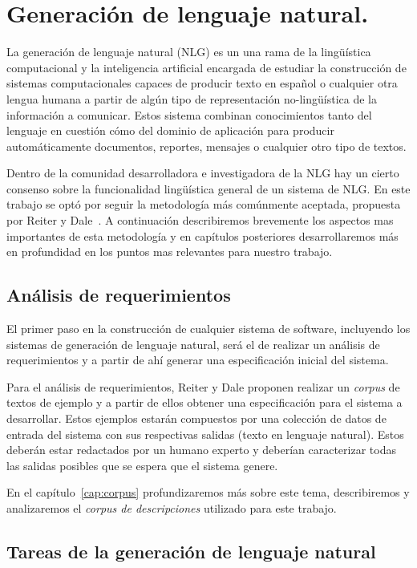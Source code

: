 \chapter{Generación de lenguaje natural.}
\label{cap:nlg_intro}
La generación de lenguaje natural (NLG) es un una rama de la lingüística computacional y la inteligencia artificial encargada de estudiar la construcción de sistemas computacionales capaces de producir texto en español o cualquier otra lengua humana a partir de algún tipo de representación no-lingüística de la información a comunicar. Estos sistema combinan conocimientos tanto del lenguaje en cuestión cómo del dominio de aplicación para producir automáticamente documentos, reportes, mensajes o cualquier otro tipo de textos.

Dentro de la comunidad desarrolladora e investigadora de la NLG hay un cierto consenso sobre la funcionalidad lingüística general de un sistema de NLG.
En este trabajo se optó por seguir la metodología más comúnmente aceptada, propuesta por Reiter y Dale~\cite{reiter_dale}.
A continuación describiremos brevemente los aspectos mas importantes de esta metodología y en capítulos posteriores desarrollaremos más en profundidad en los puntos mas relevantes para nuestro trabajo.

\section{Análisis de requerimientos}
El primer paso en la construcción de cualquier sistema de software, incluyendo los sistemas de generación de lenguaje natural, será el de realizar un análisis de requerimientos y a partir de ahí generar una especificación inicial del sistema. 

Para el análisis de requerimientos, Reiter y Dale proponen realizar un \emph{corpus} de textos de ejemplo y a partir de ellos obtener una especificación para el sistema a desarrollar. Estos ejemplos estarán compuestos por una colección de datos de entrada del sistema con sus respectivas salidas (texto en lenguaje natural). Estos deberán estar redactados por un humano experto y deberían caracterizar todas las salidas posibles que se espera que el sistema genere.

En el capítulo~\ref{cap:corpus} profundizaremos más sobre este tema, describiremos y analizaremos el \emph{corpus de descripciones} utilizado para este trabajo.

\section{Tareas de la generación de lenguaje natural}

